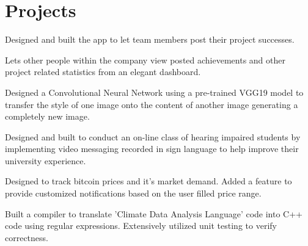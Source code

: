 \documentclass[]{rinkal_resume}
\begin{document}
\begin{minipage}[t]{0.69\textwidth}

\section{Projects}
\begin{tightemize}
\item Designed and built the app to let team members post their project successes.
\item Lets other people within the company view posted achievements and other project related statistics from an elegant dashboard.
\end{tightemize}
\sectionsep

\begin{tightemize}
\item Designed a Convolutional Neural Network using a pre-trained VGG19 model to transfer the style of one image onto the content of another image generating a completely new image.
\end{tightemize}
\sectionsep

\begin{tightemize}
\item Designed and built to conduct an on-line class of hearing impaired students by implementing video messaging recorded in sign language to help improve their university experience.
\end{tightemize}
\sectionsep

\begin{tightemize}
\item Designed to track bitcoin prices and it's market demand. Added a feature to provide customized notifications based on the user filled price range.
\end{tightemize}
\sectionsep

\begin{tightemize}
\item  Built a compiler to translate 'Climate Data Analysis Language' code into C++ code using regular expressions. Extensively utilized unit testing to verify correctness.
\end{tightemize}
\sectionsep

\end{minipage} 
\end{document}
